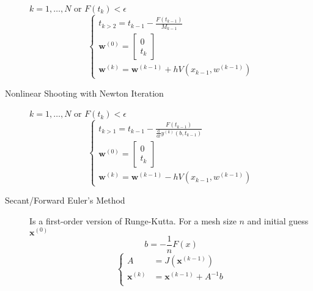 \documentclass[8pt]{article}
\newcommand{\dd}[1]{\mathrm{d}{#1}}
\newcommand{\ddt}[1]{\frac{\dd{}}{\dd{#1}}}
\begin{document}
\begin{multicols}{2}
\begin{description}
    $k=1,\ldots,N$ or $F(t_k)<\epsilon$
    \begin{equation*}
      \left\{
        \begin{array}{c}
          t_{k>2}=t_{k-1}-\frac{F(t_{k-1})}{M_{k-1}} \\
          \mathbf{w}^{(0)} =
          \left[\begin{smallmatrix}
            0 \\ t_k
          \end{smallmatrix}\right] \\
          \mathbf{w}^{(k)} = \mathbf{w}^{(k-1)} + hV(x_{k-1},w^{(k-1)})
        \end{array}
      \right.
    \end{equation*}

  \item[Nonlinear Shooting with Newton Iteration]
    $k=1,\ldots,N$ or $F(t_k)<\epsilon$
    \begin{equation*}
      \left\{
        \begin{array}{c}
          t_{k>1}=t_{k-1}-\frac{F(t_{k-1})}{\ddt{t}y^{(k)}(b,t_{k-1})} \\
          \mathbf{w}^{(0)} =
          \left[\begin{smallmatrix}
            0 \\ t_k
          \end{smallmatrix}\right] \\
          \mathbf{w}^{(k)} = \mathbf{w}^{(k-1)} - hV(x_{k-1},w^{(k-1)})
        \end{array}
      \right.
    \end{equation*}

  \item[Secant/Forward Euler's Method] Is a first-order version of Runge-Kutta. For a mesh size $n$ and
    initial guess $\mathbf{x}^{(0)}$
    \begin{equation*}
      b=-\frac{1}{n}F(x)
    \end{equation*}
    \begin{equation*}
      \left\{
        \begin{aligned}
          A &= J(\mathbf{x}^{(k-1)}) \\
          \mathbf{x}^{(k)} &= \mathbf{x}^{(k-1)}+ A^{-1}b \\
        \end{aligned}
      \right.
    \end{equation*}


\end{description}
\end{multicols}
\end{document}
